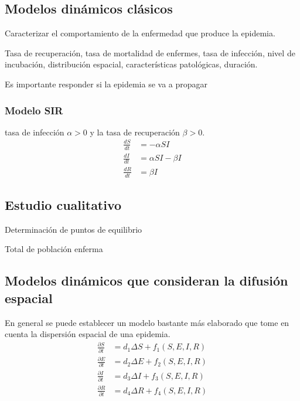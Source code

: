 \documentclass[a4paper, 10pt, twoside]{article}
\begin{document}
\subsection{Modelos dinámicos clásicos}
Caracterizar el comportamiento de la enfermedad que produce la epidemia. 

Tasa de recuperación, tasa de mortalidad de enfermes, tasa de infección, nivel de incubación, 
distribución espacial, características patológicas, duración.

Es importante responder si la epidemia se va a propagar

\subsubsection{Modelo SIR}
tasa de infección $\alpha > 0$ y la tasa de recuperación $\beta > 0$.
\begin{align}
\frac{dS}{dt} & = -\alpha S I \\
\frac{dI}{dt} & = \alpha S I - \beta I \nonumber \\
\frac{dR}{dt} & = \beta I \nonumber
\end{align}

\subsection{Estudio cualitativo}

Determinación de puntos de equilibrio

Total de población enferma

\subsection{Modelos dinámicos que consideran la difusión espacial}
En general se puede establecer un modelo bastante más elaborado que tome en cuenta la dispersión 
espacial de una epidemia.
\begin{align}
\frac{\partial S}{\partial t} & = d_1 \Delta S + f_1( S, E, I, R) \\
\frac{\partial E}{\partial t} & = d_2 \Delta E + f_2( S, E, I, R) \nonumber \\
\frac{\partial I}{\partial t} & = d_3 \Delta I + f_3( S, E, I, R) \nonumber \\
\frac{\partial R}{\partial t} & = d_4 \Delta R + f_4( S, E, I, R) \nonumber
\end{align}
\end{document}
